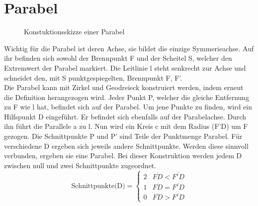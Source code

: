 \section{Parabel}
\begin{figure}[h]
	\centering
		\resizebox{.5\linewidth}{!}{
			
		}
	\caption{Konstuktionsskizze einer Parabel}
\end{figure}
Wichtig für die Parabel ist deren Achse, sie bildet die einzige Symmerieachse. Auf ihr befinden sich sowohl der Brennpunkt F und der Scheitel S, welcher den Extremwert der Parabel markiert. Die Leitlinie l steht senkrecht zur Achse und schneidet den, mit S punktgespiegelten, Brennpunkt F, F’.\\
Die Parabel kann mit Zirkel und Geodreieck konstruiert werden, indem erneut die Definition herangezogen wird. Jeder Punkt P, welcher die gleiche Entfernung zu F wie l hat, befindet sich auf der Parabel. Um jene Punkte zu finden, wird ein Hilfspunkt D eingeführt. Er befindet sich ebenfalls auf der Parabelachse. Durch ihn führt die Parallele a zu l. Nun wird ein Kreis c mit dem Radius (F'D) um F gezogen. Die Schnittpunkte P und P' sind Teile der Punktmenge Parabel. Für verschiedene D ergeben sich jeweils andere Schnittpunkte. Werden diese sinnvoll verbunden, ergeben sie eine Parabel. Bei dieser Konstruktion werden jedem D zwischen null und zwei Schnittpunkte zugeordnet.
\begin{displaymath}
   \text{Schnittpunkte(D)} = \left\{
     \begin{array}{lr}
       2 & \overline{FD} < \overline{F'D}\\
       1 & \overline{FD} = \overline{F'D}\\
       0 & \overline{FD} > \overline{F'D}
     \end{array}
   \right.
\end{displaymath}
